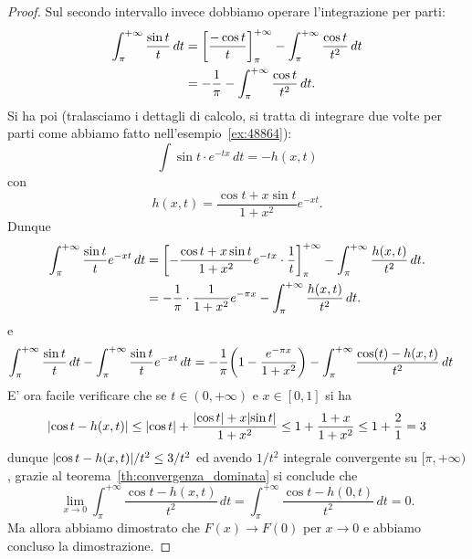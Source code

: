 \begin{proof}
Sul secondo intervallo invece dobbiamo operare l'integrazione per parti:
\begin{align*}
  \int_\pi^{+\infty} \frac{\sin t}{t}\, dt 
  &= {\left[ \frac{-\cos t}{t} \right]}_{\pi}^{+\infty}
    - \int_{\pi}^{+\infty} \frac{\cos t}{t^2}\, dt \\
  &= -\frac{1}{\pi} - \int_{\pi}^{+\infty} \frac {\cos t}{t^2}\, dt.\\
\end{align*}
Si ha poi (tralasciamo i dettagli di calcolo, 
si tratta di integrare due volte per parti come 
abbiamo fatto nell'esempio~\ref{ex:48864}):
\[
\int \sin t\cdot e^{-tx}\, dt 
= -h(x,t)
\]
con 
\[
h(x,t)= \frac{\cos t+x\sin t}{1+x^2}e^{-xt}.  
\]
Dunque 
\begin{align*}
  \int_\pi^{+\infty} \frac{\sin t}{t} e^{-xt}\, dt 
  &= {\left[ -\frac{\cos t+ x \sin t}{1+x^2}e^{-tx}\cdot \frac{1}{t} \right]}_{\pi}^{+\infty} 
  - \int_\pi^{+\infty}\frac{h(x,t)}{t^2}\, dt.\\  
  &= -\frac 1 \pi\cdot \frac{1}{1+x^2}e^{-\pi x} - \int_\pi^{+\infty}\frac{h(x,t)}{t^2}\, dt.
\end{align*}
e
\begin{align*}
\int_\pi^{+\infty} \frac{\sin t}{t}\, dt 
-\int_\pi^{+\infty} \frac{\sin t}{t} e^{-xt}\, dt
&= -\frac 1 \pi {\left( 1-\frac{e^{-\pi x}}{1+x^2} \right)}
-\int_\pi^{+\infty} \frac{\cos(t) - h(x,t)}{t^2}\, dt 
\end{align*}
E' ora facile verificare che se $t\in(0,+\infty)$
e $x\in[0,1]$ si ha 
\[
{\left|\cos t - h(x,t)\right|} \le {\left|\cos t\right|} + \frac{{\left|\cos t\right|}+x{\left|\sin t\right|}}{1+x^2}
\le 1+ \frac{1+x}{1+x^2} \le 1 + \frac 2 1 = 3
\]
dunque ${\left|\cos t - h(x,t)\right|}/t^2 \le 3/t^2$ ed avendo $1/t^2$ 
integrale convergente su $[\pi,+\infty)$, grazie 
al teorema~\ref{th:convergenza_dominata} si conclude 
che 
\[
\lim_{x\to 0} \int_\pi^{+\infty} \frac{\cos t - h(x,t)}{t^2}\, dt 
= \int_{\pi}^{+\infty} \frac{\cos t - h(0,t)}{t^2}\, dt 
= 0.  
\]
Ma allora abbiamo dimostrato che $F(x)\to F(0)$ per $x\to 0$ 
e abbiamo concluso la dimostrazione.
\end{proof}

